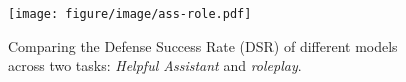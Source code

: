 \begin{figure}[h]
    \centering
    \texttt{[image: figure/image/ass-role.pdf]}
    \caption{Comparing the Defense Success Rate (DSR) of different models across two tasks: \textit{Helpful Assistant} and \textit{roleplay}.}
    \label{fig:assVSrole}
\end{figure}
